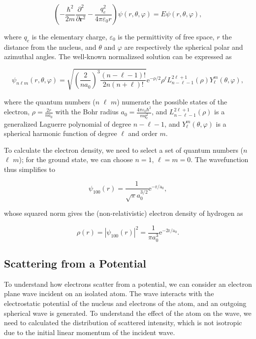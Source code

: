 \documentclass[%
 superscriptaddress,
 aip,
 amsmath,amssymb,
preprint,%
 author-year,%
longbibliography
]{revtex4-2}
\begin{document}
\begin{equation}
\left(-\frac{\hbar^{2}}{2 m} \frac{\partial^{2}}{\partial \bm{r}^{2}}-\frac{q_e^2}{4 \pi \varepsilon_{0} r}\right) \psi(r, \theta, \varphi)=E \psi(r, \theta, \varphi),
\end{equation}

where $q_e$ is the elementary charge, $\varepsilon_0$ is the permittivity of free space, $r$ the distance from the nucleus, and $\theta$ and $\varphi$ are respectively the spherical polar and azimuthal angles. The well-known normalizsed solution can be expressed as

\begin{equation}
\psi_{n \ell m}(r, \theta, \varphi)=\sqrt{\left(\frac{2}{n a_0}\right)^{3} \frac{(n-\ell-1) !}{2 n(n+\ell) !}} \mathrm{e^{-\rho / 2}} \rho^{\ell} L_{n-\ell-1}^{2 \ell+1}(\rho) Y_{\ell}^{m}(\theta, \varphi),
\end{equation}

where the quantum numbers ($n$ $\ell$ $m$) numerate the possible states of the electron, $\rho=\frac{2 r}{n a_0}$ with the Bohr radius $a_0=\frac{4 \pi \varepsilon_{0} \hbar^{2}}{m q_e^2}$, and $L_{n-\ell-1}^{2 \ell+1}(\rho)$ is a generalized Laguerre polynomial of degree $n-\ell-1$, and $Y_{\ell}^{m}(\theta, \varphi)$ is a spherical harmonic function of degree $\ell$ and order $m$.

To calculate the electron density, we need to select a set of quantum numbers ($n$ $\ell$ $m$); for the ground state, we can choose $n = 1$, $\ell = m = 0$. The wavefunction thus simplifies to

\begin{equation}
\psi_{1 0 0}(r) = \frac{1}{\sqrt{\pi} a_0^{3 / 2}} \mathrm{e^{-r / a_{0}}},
\end{equation}

whose squared norm gives the (non-relativistic) electron density of hydrogen as

\begin{equation}
\rho(r) = |\psi_{1 0 0}(r)|^2 = \frac{1}{\pi a_0^3} \mathrm{e^{-2 r / a_0}}.
\label{eq:H_density}
\end{equation}

\subsection*{Scattering from a Potential}

To understand how electrons scatter from a potential, we can consider an electron plane wave incident on an isolated atom. The wave interacts with the electrostatic potential of the nucleus and electrons of the atom, and an outgoing spherical wave is generated. To understand the effect of the atom on the wave, we need to calculated the distribution of scattered intensity, which is not isotropic due to the initial linear momentum of the incident wave.
\end{document}
